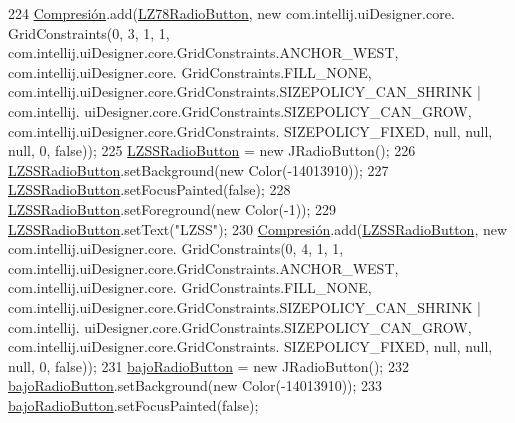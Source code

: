 \begin{DoxyCode}
224         \hyperlink{classpresentacion_1_1form_1_1PopUp__Comp_a5769b499f21466bae765c41428512966}{Compresión}.add(\hyperlink{classpresentacion_1_1form_1_1PopUp__Comp_ac750ecbde516e2fee470693124d2ff63}{LZ78RadioButton}, \textcolor{keyword}{new} com.intellij.uiDesigner.core.
      GridConstraints(0, 3, 1, 1, com.intellij.uiDesigner.core.GridConstraints.ANCHOR\_WEST, com.intellij.uiDesigner.core.
      GridConstraints.FILL\_NONE, com.intellij.uiDesigner.core.GridConstraints.SIZEPOLICY\_CAN\_SHRINK | com.intellij.
      uiDesigner.core.GridConstraints.SIZEPOLICY\_CAN\_GROW, com.intellij.uiDesigner.core.GridConstraints.
      SIZEPOLICY\_FIXED, null, null, null, 0, \textcolor{keyword}{false}));
225         \hyperlink{classpresentacion_1_1form_1_1PopUp__Comp_ad18c1029f04cc43d033183dca943977c}{LZSSRadioButton} = \textcolor{keyword}{new} JRadioButton();
226         \hyperlink{classpresentacion_1_1form_1_1PopUp__Comp_ad18c1029f04cc43d033183dca943977c}{LZSSRadioButton}.setBackground(\textcolor{keyword}{new} Color(-14013910));
227         \hyperlink{classpresentacion_1_1form_1_1PopUp__Comp_ad18c1029f04cc43d033183dca943977c}{LZSSRadioButton}.setFocusPainted(\textcolor{keyword}{false});
228         \hyperlink{classpresentacion_1_1form_1_1PopUp__Comp_ad18c1029f04cc43d033183dca943977c}{LZSSRadioButton}.setForeground(\textcolor{keyword}{new} Color(-1));
229         \hyperlink{classpresentacion_1_1form_1_1PopUp__Comp_ad18c1029f04cc43d033183dca943977c}{LZSSRadioButton}.setText(\textcolor{stringliteral}{"LZSS"});
230         \hyperlink{classpresentacion_1_1form_1_1PopUp__Comp_a5769b499f21466bae765c41428512966}{Compresión}.add(\hyperlink{classpresentacion_1_1form_1_1PopUp__Comp_ad18c1029f04cc43d033183dca943977c}{LZSSRadioButton}, \textcolor{keyword}{new} com.intellij.uiDesigner.core.
      GridConstraints(0, 4, 1, 1, com.intellij.uiDesigner.core.GridConstraints.ANCHOR\_WEST, com.intellij.uiDesigner.core.
      GridConstraints.FILL\_NONE, com.intellij.uiDesigner.core.GridConstraints.SIZEPOLICY\_CAN\_SHRINK | com.intellij.
      uiDesigner.core.GridConstraints.SIZEPOLICY\_CAN\_GROW, com.intellij.uiDesigner.core.GridConstraints.
      SIZEPOLICY\_FIXED, null, null, null, 0, \textcolor{keyword}{false}));
231         \hyperlink{classpresentacion_1_1form_1_1PopUp__Comp_add9532658d448dcbfa9b7dd40ddc8b38}{bajoRadioButton} = \textcolor{keyword}{new} JRadioButton();
232         \hyperlink{classpresentacion_1_1form_1_1PopUp__Comp_add9532658d448dcbfa9b7dd40ddc8b38}{bajoRadioButton}.setBackground(\textcolor{keyword}{new} Color(-14013910));
233         \hyperlink{classpresentacion_1_1form_1_1PopUp__Comp_add9532658d448dcbfa9b7dd40ddc8b38}{bajoRadioButton}.setFocusPainted(\textcolor{keyword}{false});

\end{DoxyCode}

